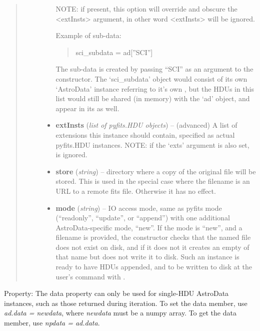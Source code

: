 \documentclass[letterpaper,10pt,english]{sphinxmanual}
\begin{document}
\begin{fulllineitems}
\begin{quote}
\begin{description}
\begin{itemize}
NOTE: if present, this option will override and obscure the 
\textless{}extInsts\textgreater{} argument, in other word \textless{}extInsts\textgreater{} will be ignored.

Example of sub-data:
\begin{quote}

sci\_subdata = ad{[}''SCI''{]}
\end{quote}

The sub-data is created by passing ``SCI'' as an argument to the
constructor. The `sci\_subdata' object would consist of its own 
`AstroData' instance referring to it's own , but the 
HDUs in this list would still be shared (in memory) with the `ad'
object, and appear in its  as well.


\item {} 
\textbf{extInsts} (\emph{list of pyfits.HDU objects}) -- (advanced) A list of extensions this instance should 
contain, specified as actual pyfits.HDU instances. NOTE: if the 
`exts' argument is also set,  is ignored.

\item {} 
\textbf{store} (\emph{string}) -- directory where a copy of the original file will be 
stored.  This is used in the special case where the
filename is an URL to a remote fits file.  Otherwise it has
no effect.

\item {} 
\textbf{mode} (\emph{string}) -- IO access mode, same as pyfits mode (``readonly'', ``update'',
or ``append'') with one additional AstroData-specific mode, ``new''.
If the mode is ``new'', and a filename is provided, the constructor
checks that the named file does not exist on disk,
and if it does not it creates an empty  of that name 
but does not write it to disk. Such an  
instance is ready to have HDUs appended, and to be written to disk
at the user's command with .

\end{itemize}

\end{description}\end{quote}

\begin{fulllineitems}
\label{astro_class:astrodata.AstroData.AstroData.data}
Property: The data property can only be used for single-HDU AstroData
instances, such as those returned during iteration. To set the 
data member, use \emph{ad.data = newdata}, where \emph{newdata} must be a 
numpy array. To get the data member, use \emph{npdata = ad.data}.


\end{fulllineitems}
\end{fulllineitems}
\end{document}
